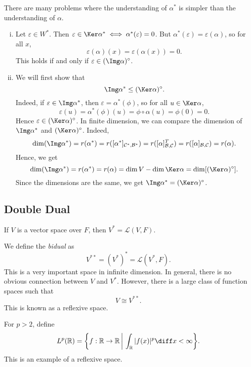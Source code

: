 \documentclass[12pt]{article}
\begin{document}
There are many problems where the understanding of $\alpha^{\ast}$ is simpler than the understanding of $\alpha$.

\begin{proofbox}
\begin{enumerate}[(i)]
	\item Let $\varepsilon \in W^{\ast}$. Then $\varepsilon \in \Ker \alpha^{\ast} \iff \alpha^{\ast} (\varepsilon) = 0$. But $\alpha^{\ast}(\varepsilon) = \varepsilon(\alpha)$, so for all $x$,
			\[
				\varepsilon(\alpha)(x) = \varepsilon(\alpha(x)) = 0
			.\]
			This holds if and only if $\varepsilon \in (\Img \alpha)^{\circ}$.
		\item We will first show that
			 \[
				 \Img \alpha^{\ast} \leq (\Ker \alpha)^{\circ}
			.\]
			Indeed, if $\varepsilon \in \Img \alpha^{\ast}$, then $\varepsilon = \alpha^{\ast}(\phi)$, so for all $u \in \Ker \alpha$,
			\[
				\varepsilon(u) = \alpha^{\ast}(\phi) (u) = \phi \circ \alpha(u) = \phi(0) = 0
			.\]
			Hence $\varepsilon \in (\Ker \alpha)^{\circ}$. In finite dimension, we can compare the dimension of $\Img \alpha^{\ast}$ and $(\Ker \alpha)^{\circ}$. Indeed,
			\[
				\dim (\Img \alpha^{\ast}) = r(\alpha^{\ast}) = r([\alpha^{\ast}]_{\mathcal{C}^{\ast}, \mathcal{B}^{\ast}}) = r([\alpha]_{\mathcal{B},\mathcal{C}}^{T}) = r([\alpha]_{\mathcal{B}, \mathcal{C}}) = r(\alpha)
			.\]
			Hence, we get
			\[
				\dim (\Img \alpha^{\ast}) = r(\alpha^{\ast}) = r(\alpha) = \dim V - \dim \Ker \alpha = \dim [(\Ker \alpha)^{\circ}]
			.\]
			Since the dimensions are the same, we get $\Img \alpha^{\ast} = (\Ker \alpha)^{\circ}$.
\end{enumerate}
\end{proofbox}

\subsection{Double Dual}%
\label{sub:double_dual}

If $V$ is a vector space over $F$, then $V^{\ast} = \mathcal{L}(V, F)$.

We define the \textit{bidual} as
\[
	V^{\ast \ast} = (V^{\ast})^{\ast} = \mathcal{L}(V^{\ast}, F)
.\]
This is a very important space in infinite dimension. In general, there is no obvious connection between $V$ and $V^{\ast}$. However, there is a large class of function spaces such that
\[
V \cong V^{\ast \ast}
.\]
This is known as a reflexive space.

\begin{exbox}
	For $p > 2$, define
	\[
		L^{p}(\mathbb{R}) = \biggl\{ f : \mathbb{R} \to \mathbb{R} \,\bigg\vert\, \int_{\mathbb{R}} |f(x)|^{p} \diff x < \infty \biggr\}
	.\]
	This is an example of a reflexive space.
\end{exbox}
\end{document}
